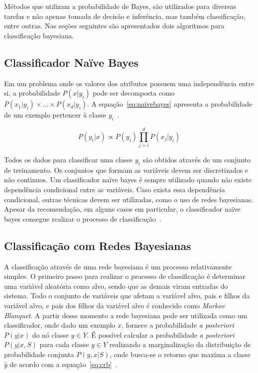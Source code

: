 Métodos que utilizam a probabilidade de Bayes, são utilizados para diversas tarefas e não apenas tomada de decisão e inferência, mas também classificação, entre outras. Nas seções seguintes são apresentados dois algoritmos para classificação bayesiana.

\subsection{Classificador Naïve Bayes}
\label{sec:naivebayes}

Em um problema onde os valores dos atributos possuem uma independência entre si, a probabilidade $P(x|y_i)$ pode ser decomposta como $P(x_1|y_i) \times \dots \times P(x_d|y_i)$. A equação~\ref{eq:naivebayes} apresenta a probabilidade de um exemplo pertencer à classe $y_i$~\cite{faceli:2011}.

\begin{equation}
    \label{eq:naivebayes}
    P(y_i|x) \propto P(y_i) \prod_{j=i}^{d}P(x_j|y_i)
\end{equation}

Todos os dados para classificar uma classe $y_i$ são obtidos através de um conjunto de treinamento. Os conjuntos que formam as variáveis devem ser discretizados e não continuos. Um classificador naïve bayes é sempre utilizado quando não existe dependência condicional entre as variáveis. Caso exista essa dependência condicional, outras técnicas devem ser utilizadas, como o uso de redes bayesianas. Apesar da recomendação, em alguns casos em particular, o classificador naïve bayes consegue realizar o processo de classificação~\cite{faceli:2011}.

\subsection{Classificação com Redes Bayesianas}
\label{sec:rbclassificador}

A classificação através de uma rede bayesiana é um processo relativamente simples. O primeiro passo para realizar o processo de classificação é determinar uma variável aleatória como alvo, sendo que as demais viram entradas do sistema. Todo o conjunto de variáveis que afetam a variável alvo, pais e filhos da variável alvo, e pais dos filhos da variável alvo é conhecido como \emph{Markov Blanquet}. A partir desse momento a rede bayesiana pode ser utilizada como um classificador, onde dado um exemplo $x$, fornece a probabilidade \emph{a posteriori} $P(y | x)$ do nó classe $y \in Y$. É possível calcular a probabilidade \emph{a posteriori} $P(y|x,S)$ para cada classe $y \in Y$ realizando a marginalização da distribuição de probabilidade conjunta $P(y,x|S)$, onde busca-se o retorno que maxima a classe $\hat{y}$ de acordo com a equação~\ref{eq:crb}~\cite{faceli:2011}.

